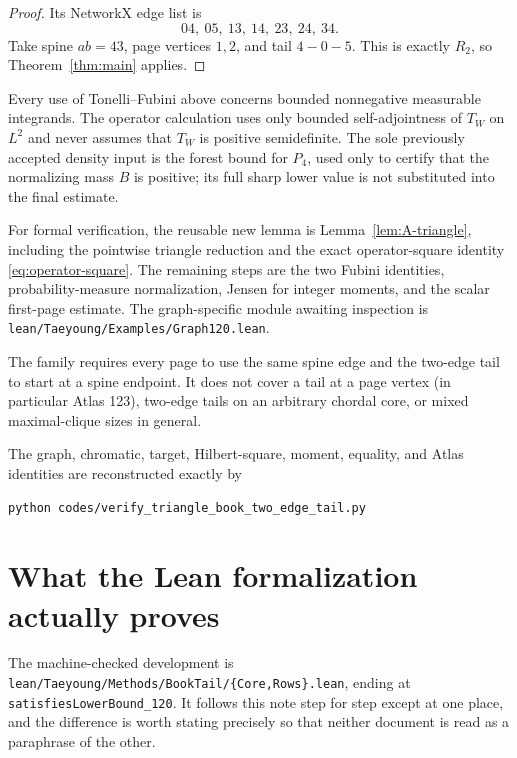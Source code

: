 \documentclass[11pt]{article}
\begin{document}
\begin{proof}
Its NetworkX edge list is
\[
 04,\ 05,\ 13,\ 14,\ 23,\ 24,\ 34.
\]
Take spine $ab=43$, page vertices $1,2$, and tail $4-0-5$.
This is exactly $R_2$, so Theorem~\ref{thm:main} applies.
\end{proof}

Every use of Tonelli--Fubini above concerns bounded nonnegative measurable
integrands.  The operator calculation uses only bounded self-adjointness of
$T_W$ on $L^2$ and never assumes that $T_W$ is positive semidefinite.
The sole previously accepted density input is the forest bound for $P_4$,
used only to certify that the normalizing mass $B$ is positive; its full
sharp lower value is not substituted into the final estimate.

For formal verification, the reusable new lemma is
Lemma~\ref{lem:A-triangle}, including the pointwise triangle reduction and
the exact operator-square identity \eqref{eq:operator-square}.  The remaining
steps are the two Fubini identities, probability-measure normalization,
Jensen for integer moments, and the scalar first-page estimate.  The
graph-specific module awaiting inspection is
\texttt{lean/Taeyoung/Examples/Graph120.lean}.

The family requires every page to use the same spine edge and the two-edge
tail to start at a spine endpoint.  It does not cover a tail at a page
vertex (in particular Atlas 123), two-edge tails on an arbitrary chordal
core, or mixed maximal-clique sizes in general.

The graph, chromatic, target, Hilbert-square, moment, equality, and Atlas
identities are reconstructed exactly by
\begin{verbatim}
python codes/verify_triangle_book_two_edge_tail.py
\end{verbatim}


\section{What the Lean formalization actually proves}

The machine-checked development is
\texttt{lean/Taeyoung/Methods/BookTail/\{Core,Rows\}.lean}, ending at
\texttt{satisfiesLowerBound\_120}.  It follows this note step for step except at
one place, and the difference is worth stating precisely so that neither
document is read as a paraphrase of the other.
\end{document}
